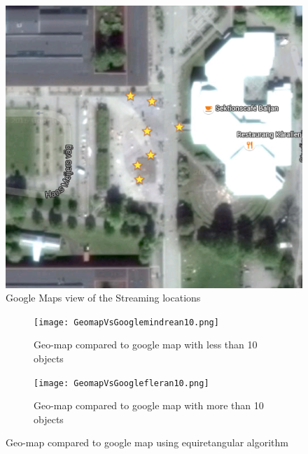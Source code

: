 \begin{figure}[ht!]
\begin{center}
	\includegraphics[scale=0.64]{Google_Maps.png}
	\caption{Google Maps view of the Streaming locations}
	\label{fig:googlemaps}
\end{center}
\end{figure}

\begin{figure}
\begin{subfigure}[b]{0.5\textwidth}
        \texttt{[image: GeomapVsGooglemindrean10.png]}
        \caption{Geo-map compared to google map with less than 10 objects}
        \label{fig:GeomapVsGoogleLessThan10objects}
    \end{subfigure}\hfill 
    \hspace{3px}
    \begin{subfigure}[b]{0.51\textwidth}
        \texttt{[image: GeomapVsGooglefleran10.png]}
        \caption{Geo-map compared to google map with more than 10 objects}
        \label{fig:tiger}
    \label{fig:GeomapVsGoogleMoreThan10objects}
    \end{subfigure}
	\caption{Geo-map compared to google map using equiretangular algorithm}
	\label{fig:GeomapVsGoogleWithLessThan10objects}
\end{figure}

